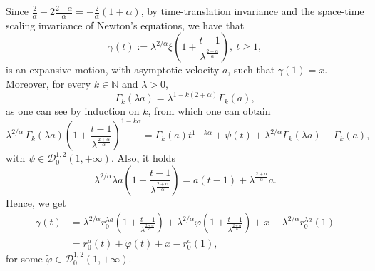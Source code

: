 \documentclass[a4paper,10pt]{amsart}
\theoremstyle{plain}
\theoremstyle{definition}
\numberwithin{equation}{section}
\numberwithin{thm}{section}
\begin{document}
Since $\frac{2}{\alpha}-2\frac{2+\alpha}{\alpha}=-\frac{2}{\alpha}(1+\alpha)$, by time-translation invariance and the space-time scaling invariance of Newton's equations, we have that
\[
\gamma(t):=\lambda^{2/\alpha}\xi\left(1+\frac{t-1}{\lambda^{\frac{2+\alpha}{\alpha}}}\right), \ t \ge 1,
\]
is an expansive motion, with asymptotic velocity $a$, such that $\gamma(1)=x$. Moreover, 
for every $k \in \mathbb N$ and $\lambda >0$,
\[
\Gamma_k(\lambda a)=\lambda^{1-k(2+\alpha)}\Gamma_k(a),
\]
as one can see by induction on $k$, from which one can obtain
\[
\lambda^{2/\alpha}\,\Gamma_k(\lambda a) \left(1+\frac{t-1}{\lambda^{\frac{2+\alpha}{\alpha}}}\right)^{1-k\alpha}=\Gamma_k(a) t^{1-k\alpha}+\psi(t)+\lambda^{2/\alpha}\Gamma_k(\lambda a)-\Gamma_k(a),
\]
with $\psi \in \mathcal{D}^{1,2}_0(1,+\infty)$. Also, it holds
\[
\lambda^{2/\alpha} \lambda a \left(1+\frac{t-1}{\lambda^{\frac{2+\alpha}{\alpha}}}\right)=a(t-1)+\lambda^{\frac{2+\alpha}{\alpha}}a.
\]
Hence, we get
\[
\begin{aligned}
\gamma(t)&=\lambda^{2/\alpha}r_0^{\lambda a}\left(1+\frac{t-1}{\lambda^{\frac{2+\alpha}{\alpha}}}\right) + \lambda^{2/\alpha} \varphi\left(1+\frac{t-1}{\lambda^{\frac{2+\alpha}{\alpha}}}\right)+x-\lambda^{2/\alpha}r_0^{\lambda a}(1)
\\
&=r_0^a(t)+\tilde\varphi(t)+x-r_0^a(1),
\end{aligned}
\]
for some $\tilde \varphi \in \mathcal{D}^{1,2}_0(1,+\infty)$.
\end{document}
